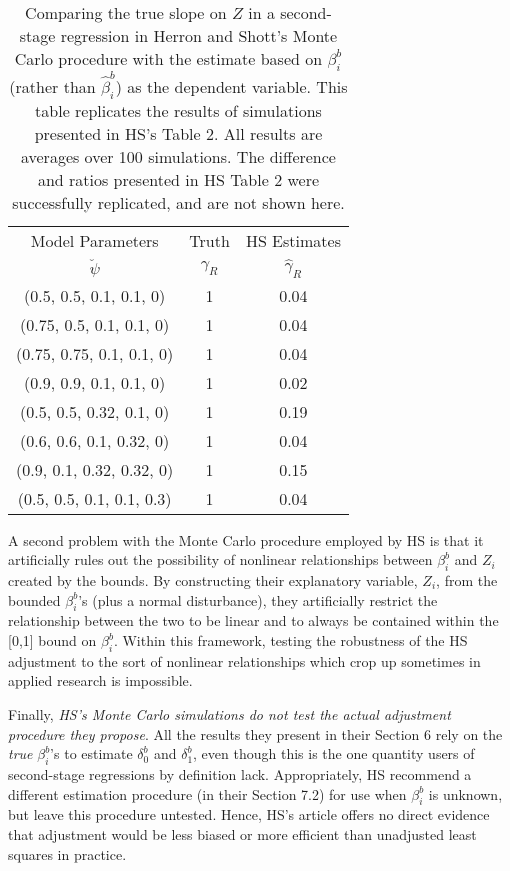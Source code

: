 \documentclass[11pt,titlepage]{article}
\begin{document}
\begin{table}[tb]
\label{t:hsrep}
\begin{center}
\begin{tabular}{c|cc}
Model Parameters & Truth & \multicolumn{1}{c}{HS Estimates} \\
$\breve\psi$  & $\gamma_R$ & $\hat\gamma_R$ \\\hline
(0.5, 0.5, 0.1, 0.1, 0)  &1      &       0.04\\  
(0.75, 0.5, 0.1, 0.1, 0) &1      &       0.04  \\
(0.75, 0.75, 0.1, 0.1, 0)&1      &       0.04  \\
(0.9, 0.9, 0.1, 0.1, 0)  &1      &       0.02  \\
(0.5, 0.5, 0.32, 0.1, 0) &1      &       0.19  \\
(0.6, 0.6, 0.1, 0.32, 0) &1      &       0.04  \\
(0.9, 0.1, 0.32, 0.32, 0)&1      &       0.15  \\
(0.5, 0.5, 0.1, 0.1, 0.3)&1      &       0.04  \\
\hline
\end{tabular}
\end{center}
\caption{Comparing the true slope on $Z$ in a 
second-stage regression in Herron and Shott's Monte Carlo 
procedure with the estimate based on $\beta_i^b$ 
(rather than $\hat\beta_i^b$) as the dependent variable.
This table replicates the results of simulations presented in
HS's Table 2.  All results are averages over 100 simulations.  
The difference and ratios presented in HS Table 2 were  
successfully replicated, and are not shown here.}
\end{table}

A second problem with the Monte Carlo procedure employed by HS is that
it artificially rules out the possibility of nonlinear relationships
between $\beta_i^b$ and $Z_i$ created by the bounds.  By constructing
their explanatory variable, $Z_i$, from the bounded $\beta_i^b$'s
(plus a normal disturbance), they artificially restrict the
relationship between the two to be linear and to always be contained
within the [0,1] bound on $\beta_i^b$.  Within this framework, testing
the robustness of the HS adjustment to the sort of nonlinear
relationships which crop up sometimes in applied research is
impossible.

Finally, \emph{HS's Monte Carlo simulations do not test the actual
  adjustment procedure they propose}.  All the results they present in
their Section 6 rely on the \emph{true} $\beta_i^b$'s to estimate
$\delta_0^b$ and $\delta_1^b$, even though this is the one quantity
users of second-stage regressions by definition lack.  Appropriately,
HS recommend a different estimation procedure (in their Section 7.2)
for use when $\beta_i^b$ is unknown, but leave this procedure
untested.  Hence, HS's article offers no direct evidence that
adjustment would be less biased or more efficient than unadjusted
least squares in practice.
\end{document}
